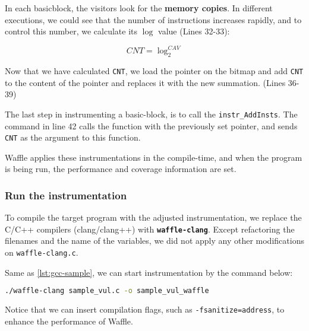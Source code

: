 In each basicblock, the visitors look for the \textbf{memory copies}. In different executions, we could see that the number of instructions increases rapidly, and to control this number, we calculate its $\log$ value (Lines 32-33):

\begin{equation}
  \label{eq:log}
  CNT = \log_{2}^{CAV} 
\end{equation}

Now that we have calculated \texttt{CNT}, we load the pointer on the bitmap and add \texttt{CNT} to the content of the pointer and replaces it with the new summation. (Lines 36-39)

The last step in instrumenting a basic-block, is to call the \texttt{instr\_AddInsts}. The command in line 42 calls the function with the previously set pointer, and sends \texttt{CNT} as the argument to this function.

Waffle applies these instrumentations in the compile-time, and when the program is being run, the performance and coverage information are set.

\subsubsection*{Run the instrumentation}

To compile the target program with the adjusted instrumentation, we replace the C/C++ compilers (clang/clang++) with \textbf{\texttt{waffle-clang}}.  \cite{clang-fast} Except refactoring the filenames and the name of the variables, we did not apply any other modifications on \texttt{waffle-clang.c}.

Same as \ref{lst:gcc-sample}, we can start instrumentation by the command below:

\begin{lstlisting}[language=bash,style=CommandStyle,label={lst:wafl-clang}]
  ./waffle-clang sample_vul.c -o sample_vul_waffle
\end{lstlisting}

Notice that we can insert compilation flags, such as \texttt{-fsanitize=address}, to enhance the performance of Waffle.
